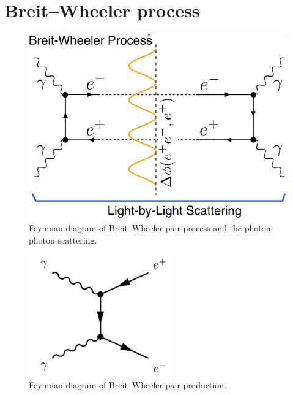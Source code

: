 \documentclass{paper}
\begin{document}
\section{Breit–Wheeler process}

\begin{figure}[!th]
	\centering
	\includegraphics[width=0.5\linewidth]{figures/Breit-Wheeler.png}
	\caption{Feynman diagram of Breit–Wheeler pair process and the photon-photon scattering.}
	\label{fig:Feynman-diagram-of-Breit–Wheeler}
\end{figure}

\begin{figure}[!th]
	\centering
	\includegraphics[width=0.5\linewidth]{figures/Feynman-Breit.png}
	\caption{Feynman diagram of Breit–Wheeler pair production.}
	\label{fig:Breit–Wheeler-pair}
\end{figure}
\end{document}
